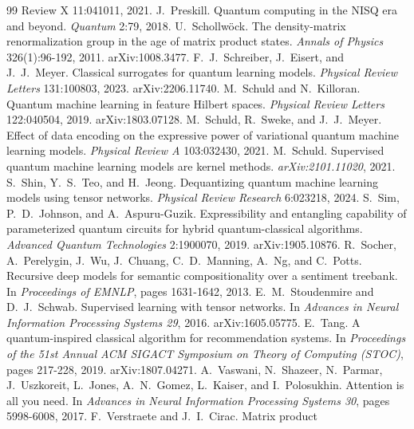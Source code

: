 \documentclass[10pt]{article}
\begin{document}
\begin{thebibliography}{99}
{Review X} 11:041011, 2021.
 J.~Preskill. Quantum computing in the NISQ era and beyond.
\emph{Quantum} 2:79, 2018.
 U.~Schollw\"ock. The density-matrix renormalization
group in the age of matrix product states. \emph{Annals of Physics} 326(1):96-192, 2011.
arXiv:1008.3477.
 F.~J.~Schreiber, J.~Eisert, and J.~J.~Meyer.
Classical surrogates for quantum learning models. \emph{Physical Review Letters} 131:100803, 2023.
arXiv:2206.11740.
 M.~Schuld and N.~Killoran. Quantum machine learning
in feature Hilbert spaces. \emph{Physical Review Letters} 122:040504, 2019. arXiv:1803.07128.
 M.~Schuld, R.~Sweke, and J.~J.~Meyer. Effect of data
encoding on the expressive power of variational quantum machine learning models. \emph{Physical
Review A} 103:032430, 2021.
 M.~Schuld. Supervised quantum machine learning models are
kernel methods. \emph{arXiv:2101.11020}, 2021.
 S.~Shin, Y.~S.~Teo, and H.~Jeong. Dequantizing quantum machine
learning models using tensor networks. \emph{Physical Review Research} 6:023218, 2024.
 S.~Sim, P.~D.~Johnson, and A.~Aspuru-Guzik. Expressibility and
entangling capability of parameterized quantum circuits for hybrid quantum-classical algorithms.
\emph{Advanced Quantum Technologies} 2:1900070, 2019. arXiv:1905.10876.
 R.~Socher, A.~Perelygin, J.~Wu, J.~Chuang, C.~D.~Manning,
A.~Ng, and C.~Potts. Recursive deep models for semantic compositionality over a sentiment treebank.
In \emph{Proceedings of EMNLP}, pages 1631-1642, 2013.
 E.~M.~Stoudenmire and D.~J.~Schwab.
Supervised learning with tensor networks. In \emph{Advances in Neural Information Processing Systems
29}, 2016. arXiv:1605.05775.
 E.~Tang. A quantum-inspired classical algorithm for recommendation
systems. In \emph{Proceedings of the 51st Annual ACM SIGACT Symposium on Theory of Computing
(STOC)}, pages 217-228, 2019. arXiv:1807.04271.
 A.~Vaswani, N.~Shazeer, N.~Parmar, J.~Uszkoreit,
L.~Jones, A.~N.~Gomez, L.~Kaiser, and I.~Polosukhin. Attention is all you need. In \emph{Advances in
Neural Information Processing Systems 30}, pages 5998-6008, 2017.
 F.~Verstraete and J.~I.~Cirac. Matrix product

\end{thebibliography}
\end{document}
